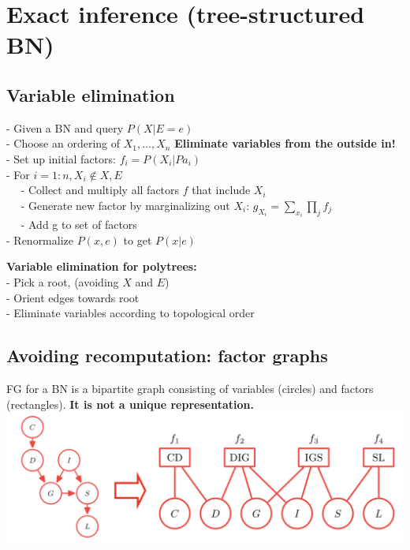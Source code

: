\section{Exact inference (tree-structured BN) }
\subsection{Variable elimination}
- Given a BN and query $P(X|E=e)$\\
- Choose an ordering of $X_1, ..., X_n$ \textbf{Eliminate variables from the outside in!}\\
- Set up initial factors: $f_i=P(X_i|Pa_i)$\\
- For $i=1:n, X_i \notin {X, E}$\\
$\quad$ - Collect and multiply all factors $f$ that include $X_i$\\
$\quad$ - Generate new factor by marginalizing out $X_i$:
        $g_X_i = \sum_{x_i}\prod_j f_j$\\
$\quad$ - Add g to set of factors\\
- Renormalize $P(x,e)$ to get $P(x|e)$

\textbf{Variable elimination for polytrees:}\\
- Pick a root, (avoiding $X$ and $E$)\\
- Orient edges towards root\\
- Eliminate variables according to topological order


\subsection{Avoiding recomputation: factor graphs}
FG for a BN is a bipartite graph consisting of variables (circles) and factors (rectangles). \textbf{It is not a unique representation.}\\
\includegraphics[scale=0.25]{images/factor_graph.png}
